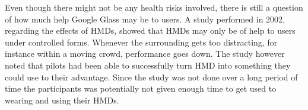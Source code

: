 Even though there might not be any health risks involved, there is still a question of how much help Google Glass may be to users. A study performed in 2002\cite{laramee02}, regarding the effects of HMDs, showed that HMDs may only be of help to users under controlled forms. Whenever the surrounding gets too distracting, for instance within a moving crowd, performance goes down. The study however noted that pilots had been able to successfully turn HMD into something they could use to their advantage. Since the study was not done over a long period of time the participants was potentially not given enough time to get used to wearing and using their HMDs.

